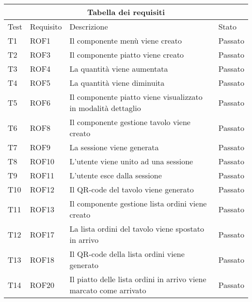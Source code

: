 \begin{center}
    \renewcommand{\arraystretch}{1.5}
    \begin{longtable}{ |p{1cm}|p{1.5cm}|p{9cm}|p{1.5cm}|  }
        \hline
        \multicolumn{4}{|c|}{Tabella dei requisiti} \\
        \hline
        Test&Requisito&Descrizione &Stato \\
        \hline
        \endhead
        T1&ROF1&Il componente menù viene creato&Passato \\
        T2&ROF3&Il componente piatto viene creato&Passato \\
        T3&ROF4&La quantità viene aumentata&Passato \\
        T4&ROF5&La quantità viene diminuita&Passato \\
        T5&ROF6&Il componente piatto viene visualizzato in modalità dettaglio&Passato \\
        T6&ROF8&Il componente gestione tavolo viene creato &Passato \\
        T7&ROF9&La sessione viene generata&Passato\\
        T8&ROF10&L'utente viene unito ad una sessione&Passato \\
        T9&ROF11&L'utente esce dalla sessione&Passato\\
        T10&ROF12&Il QR-code del tavolo viene generato&Passato\\
        T11&ROF13&Il componente gestione lista ordini viene creato&Passato\\
        T12&ROF17&La lista ordini del tavolo viene spostato in arrivo&Passato\\
        T13&ROF18&Il QR-code della lista ordini viene generato &Passato\\
        T14&ROF20&Il piatto delle lista ordini in arrivo viene marcato come arrivato&Passato\\

\end{longtable}
\end{center}
